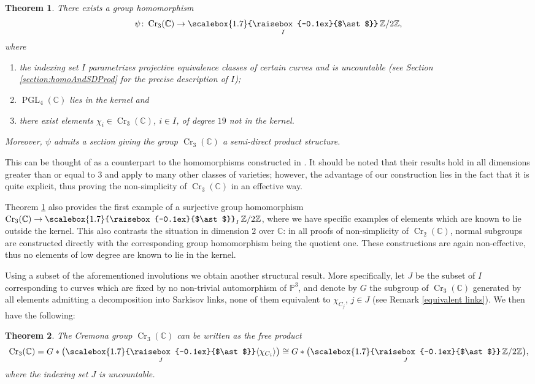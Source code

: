 \documentclass[JEP,XML,SOM,Unicode,published]{cedram}
\theoremstyle{plain}
\newtheorem{introductiontheorem}{Theorem}
\theoremstyle{definition}
\newcommand\Cr{\operatorname{Cr}}
\newcommand\PGL{\operatorname{PGL}}
\newcommand{\ZZ}{\mathbb{Z}}
\newcommand{\CC}{\mathbb{C}}
\newcommand{\PP}{\mathbb{P}}
\let\isom\cong
\newcommand{\freeprod}{\mathop{\scalebox{1.7}{\raisebox{-0.1ex}{$\ast$}}}}
\begin{document}
\begin{introductiontheorem}\label{main theorem 1}
There exists a group homomorphism
\[
\psi\colon \Cr_3(\CC) \to \freeprod_I \ZZ/2\ZZ,
\]
where
\begin{enumerate}
\item the indexing set $I$ parametrizes projective equivalence classes of certain curves and is uncountable (see Section \ref{section:homoAndSDProd} for the precise description of $I$);
\item $\PGL_4(\CC)$ lies in the kernel and
\item there exist elements $\chi_i \in \Cr_3(\CC)$, $i\in I$, of degree $19$ not in the kernel.
\end{enumerate}
Moreover, $\psi$ admits a section giving the group $\Cr_3(\CC)$ a semi-direct product structure.
\end{introductiontheorem}

This can be thought of as a counterpart to the homomorphisms constructed in \cite{BLZ}.
It should be noted that their results hold in all dimensions greater than or equal to $3$ and apply to many other classes of varieties;
however, the advantage of our construction lies in the fact that it is quite explicit,
thus proving the non-simplicity of $\Cr_3(\CC)$ in an effective way.

Theorem \ref{main theorem 1} also provides the first example of a surjective group homomorphism $\Cr_3(\CC) \to \freeprod_I \ZZ/2\ZZ$, where we have specific examples of elements which are known to lie outside the kernel. This also contrasts the situation in dimension $2$ over $\CC$:
in all proofs of non-simplicity of $\Cr_2(\CC)$, normal subgroups are constructed directly with the corresponding group homomorphism being the quotient one. These constructions are again non-effective, thus no elements of low degree are known to lie in the kernel.

Using a subset of the aforementioned involutions we obtain another structural result. More specifically, let $J$ be the subset of $I$ corresponding to curves which are fixed by no non-trivial automorphism of $\PP^3$,
and denote by $G$ the subgroup of $\Cr_3(\CC)$ generated by all elements admitting a decomposition into Sarkisov links, none of them equivalent to $\chi_{C_j}$, $j\in J$ (see Remark \ref{equivalent links}).
We then have the following:

\begin{introductiontheorem}\label{main theorem 2}
The Cremona group $\Cr_3(\CC)$ can be written as the free product
\[
\Cr_3(\CC) = G \ast \bigl(\freeprod_J \langle \chi_{C_i} \rangle \bigr) \isom G \ast \bigl(\freeprod_J \ZZ/2\ZZ\bigr),
\]
where the indexing set $J$ is uncountable.
\end{introductiontheorem}
\end{document}
